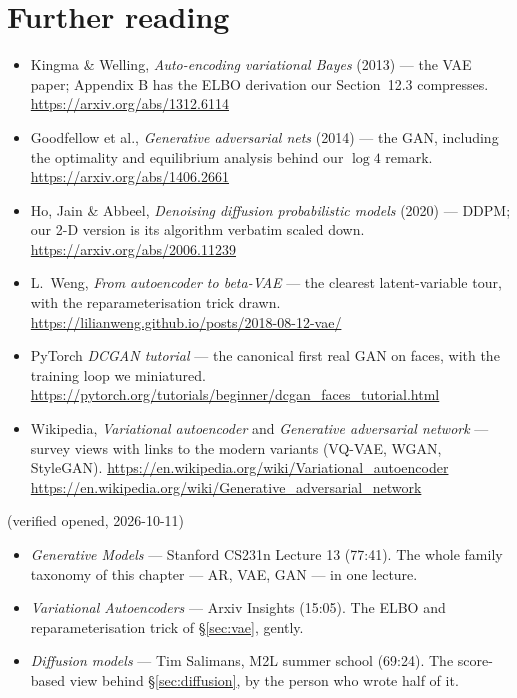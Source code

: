 \section*{Further reading}
\label{sec:further12}
\begin{itemize}
\item Kingma \& Welling, \emph{Auto-encoding variational Bayes}
(2013) --- the VAE paper; Appendix B has the ELBO derivation our
Section~12.3 compresses. \url{https://arxiv.org/abs/1312.6114}
\item Goodfellow et al., \emph{Generative adversarial nets} (2014)
--- the GAN, including the optimality and equilibrium analysis
behind our $\log 4$ remark. \url{https://arxiv.org/abs/1406.2661}
\item Ho, Jain \& Abbeel, \emph{Denoising diffusion probabilistic
models} (2020) --- DDPM; our 2-D version is its algorithm verbatim
scaled down. \url{https://arxiv.org/abs/2006.11239}
\item L.~Weng, \emph{From autoencoder to beta-VAE} --- the clearest
latent-variable tour, with the reparameterisation trick drawn.
\url{https://lilianweng.github.io/posts/2018-08-12-vae/}
\item PyTorch \emph{DCGAN tutorial} --- the canonical first real GAN
on faces, with the training loop we miniatured.
\url{https://pytorch.org/tutorials/beginner/dcgan_faces_tutorial.html}
\item Wikipedia, \emph{Variational autoencoder} and
\emph{Generative adversarial network} --- survey views with links to
the modern variants (VQ-VAE, WGAN, StyleGAN).
\url{https://en.wikipedia.org/wiki/Variational_autoencoder}
\url{https://en.wikipedia.org/wiki/Generative_adversarial_network}
\end{itemize}

\begin{rulebox}
(verified opened, 2026-10-11)
\begin{itemize}
\item \emph{Generative Models} --- Stanford CS231n Lecture 13
(77:41). The whole family taxonomy of this chapter --- AR, VAE,
GAN --- in one lecture.
\item \emph{Variational Autoencoders} --- Arxiv Insights (15:05).
The ELBO and reparameterisation trick of \S\ref{sec:vae}, gently.
\item \emph{Diffusion models} --- Tim Salimans, M2L summer school
(69:24). The score-based view behind \S\ref{sec:diffusion}, by the
person who wrote half of it.
\end{itemize}
\end{rulebox}


